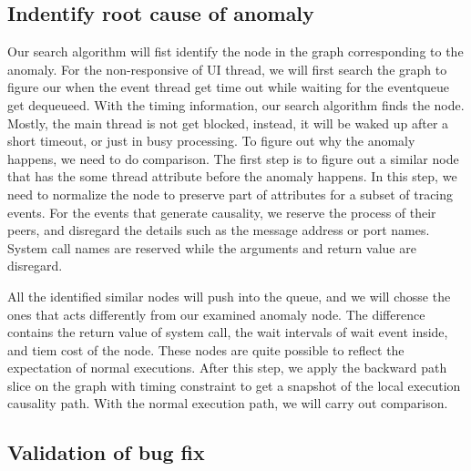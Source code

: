\subsection{Indentify root cause of anomaly}
Our search algorithm will fist identify the node in the graph corresponding to the anomaly.
For the non-responsive of UI thread, we will first search the graph to figure our when the event thread get time out while waiting for the eventqueue get dequeueed.
With the timing information, our search algorithm finds the node.
Mostly, the main thread is not get blocked, instead, it will be waked up after a short timeout, or just in busy processing.
To figure out why the anomaly happens, we need to do comparison.
The first step is to figure out a similar node that has the some thread attribute before the anomaly happens.
In this step, we need to normalize the node to preserve part of attributes for a subset of tracing events.
For the events that generate causality, we reserve the process of their peers, and disregard the details such as the message address or port names.
System call names are reserved while the arguments and return value are disregard.

All the identified similar nodes will push into the queue, and we will chosse the ones that acts differently from our examined anomaly node.
The difference contains the return value of system call, the wait intervals of wait event inside, and tiem cost of the node.
These nodes are quite possible to reflect the expectation of normal executions.
After this step, we apply the backward path slice on the graph with timing constraint to get a snapshot of the local execution causality path.
With the normal execution path, we will carry out comparison.



\subsection{Validation of bug fix}

